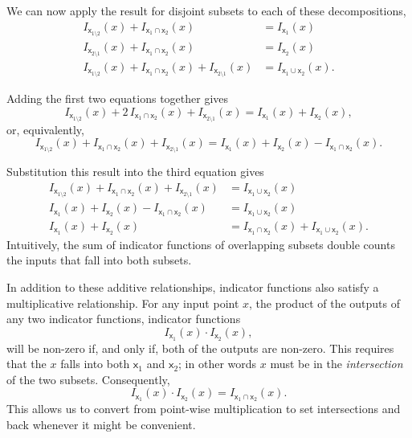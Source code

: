 \documentclass[
  letterpaper,
  DIV=11,
  numbers=noendperiod]{scrartcl}
\begin{document}
We can now apply the result for disjoint subsets to each of these
decompositions, \begin{align*}
I_{ \mathsf{x}_{1 \setminus 2} } (x)
+
I_{ \mathsf{x}_{1} \cap \mathsf{x}_{2} } (x)
&=
I_{ \mathsf{x}_{1} } (x)
\\
I_{ \mathsf{x}_{2 \setminus 1} } (x)
+
I_{ \mathsf{x}_{1} \cap \mathsf{x}_{2} } (x)
&=
I_{ \mathsf{x}_{2} } (x)
\\
I_{ \mathsf{x}_{1 \setminus 2} } (x)
+
I_{ \mathsf{x}_{1} \cap \mathsf{x}_{2} } (x)
+
I_{ \mathsf{x}_{2 \setminus 1} } (x)
&=
I_{ \mathsf{x}_{1} \cup \mathsf{x}_{2} } (x).
\end{align*}

Adding the first two equations together gives \[
I_{ \mathsf{x}_{1 \setminus 2} } (x)
+
2 \, I_{ \mathsf{x}_{1} \cap \mathsf{x}_{2} } (x)
+
I_{ \mathsf{x}_{2 \setminus 1} } (x)
=
I_{ \mathsf{x}_{1} } (x)
+
I_{ \mathsf{x}_{2} } (x),
\] or, equivalently, \[
I_{ \mathsf{x}_{1 \setminus 2} } (x)
+
I_{ \mathsf{x}_{1} \cap \mathsf{x}_{2} } (x)
+
I_{ \mathsf{x}_{2 \setminus 1} } (x)
=
I_{ \mathsf{x}_{1} } (x)
+
I_{ \mathsf{x}_{2} } (x)
-
I_{ \mathsf{x}_{1} \cap \mathsf{x}_{2} } (x).
\]

Substitution this result into the third equation gives \begin{align*}
I_{ \mathsf{x}_{1 \setminus 2} } (x)
+
I_{ \mathsf{x}_{1} \cap \mathsf{x}_{2} } (x)
+
I_{ \mathsf{x}_{2 \setminus 1} } (x)
&=
I_{ \mathsf{x}_{1} \cup \mathsf{x}_{2} } (x)
\\
I_{ \mathsf{x}_{1} } (x)
+
I_{ \mathsf{x}_{2} } (x)
-
I_{ \mathsf{x}_{1} \cap \mathsf{x}_{2} } (x)
&=
I_{ \mathsf{x}_{1} \cup \mathsf{x}_{2} } (x)
\\
I_{ \mathsf{x}_{1} } (x)
+
I_{ \mathsf{x}_{2} } (x)
&=
I_{ \mathsf{x}_{1} \cap \mathsf{x}_{2} } (x)
+
I_{ \mathsf{x}_{1} \cup \mathsf{x}_{2} } (x).
\end{align*} Intuitively, the sum of indicator functions of overlapping
subsets double counts the inputs that fall into both subsets.

In addition to these additive relationships, indicator functions also
satisfy a multiplicative relationship. For any input point \(x\), the
product of the outputs of any two indicator functions, indicator
functions \[
I_{\mathsf{x}_{1}} (x)
\cdot
I_{\mathsf{x}_{2}} (x),
\] will be non-zero if, and only if, both of the outputs are non-zero.
This requires that the \(x\) falls into both \(\mathsf{x}_{1}\) and
\(\mathsf{x}_{2}\); in other words \(x\) must be in the
\emph{intersection} of the two subsets. Consequently, \[
I_{\mathsf{x}_{1}} (x)
\cdot
I_{\mathsf{x}_{2}} (x)
=
I_{\mathsf{x}_{1} \cap \mathsf{x}_{2}} (x).
\] This allows us to convert from point-wise multiplication to set
intersections and back whenever it might be convenient.
\end{document}

